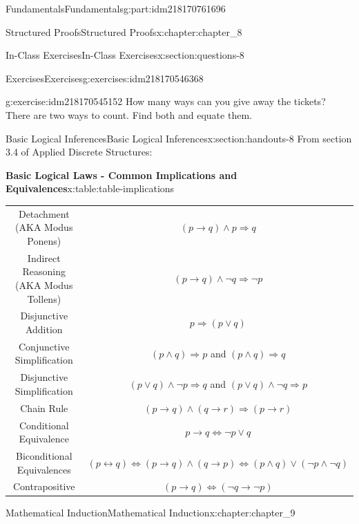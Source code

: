 \documentclass[oneside,10pt,]{book}
\newcommand{\tabularfont}{\relax}
\numberwithin{equation}{section}
\newcommand{\hrulemedium}{\noalign{\hrule height 0.07em}}
\begin{document}
\begin{partptx}{Fundamentals}{}{Fundamentals}{}{}{g:part:idm218170761696}
\begin{chapterptx}{Structured Proofs}{}{Structured Proofs}{}{}{x:chapter:chapter_8}
\begin{sectionptx}{In-Class Exercises}{}{In-Class Exercises}{}{}{x:section:questions-8}
\begin{exercises-subsection-numberless}{Exercises}{}{Exercises}{}{}{g:exercises:idm218170546368}
\begin{exercisegroup}
\begin{divisionexerciseeg}{3}{}{}{g:exercise:idm218170545152}
How many ways can you give away the tickets? There are two ways to count. Find both and equate them.%
\end{divisionexerciseeg}%
\end{exercisegroup}
\par\medskip\noindent
\end{exercises-subsection-numberless}
\end{sectionptx}
%
%
\typeout{************************************************}
\typeout{************************************************}
%
\begin{sectionptx}{Basic Logical Inferences}{}{Basic Logical Inferences}{}{}{x:section:handouts-8}
From section 3.4 of Applied Discrete Structures:%
\begin{tableptx}{\textbf{Basic Logical Laws - Common Implications and Equivalences}}{x:table:table-implications}{}%
%
%
%
%
\centering%
{\tabularfont%
\begin{tabular}{cc}
Detachment (AKA Modus Ponens)&\((p \rightarrow  q) \land  p\Rightarrow  q\)\tabularnewline\hrulemedium
Indirect Reasoning (AKA Modus Tollens)&\((p \to  q) \land  \neg q \Rightarrow  \neg p\)\tabularnewline\hrulemedium
Disjunctive Addition&\(p\Rightarrow (p\lor q)\)\tabularnewline\hrulemedium
Conjunctive Simplification&\((p \land  q) \Rightarrow  p\) and \((p \land  q) \Rightarrow  q\)\tabularnewline\hrulemedium
Disjunctive Simplification&\((p \lor  q) \land  \neg p \Rightarrow  q\) and \((p \lor q) \land \neg q\Rightarrow p\)\tabularnewline\hrulemedium
Chain Rule&\((p \to  q) \land  ( q \rightarrow  r) \Rightarrow  (p\to  r)\)\tabularnewline\hrulemedium
Conditional Equivalence&\(p \rightarrow  q \Leftrightarrow  \neg p \lor  q\)\tabularnewline\hrulemedium
Biconditional Equivalences&\((p \leftrightarrow  q) \Leftrightarrow  (p\rightarrow q) \land  (q \rightarrow  p)\Leftrightarrow (p \land  q) \lor  (\neg p \land  \neg q)\)\tabularnewline\hrulemedium
Contrapositive&\((p\to q) \Leftrightarrow (\neg q \to \neg p)\)
\end{tabular}
}%
\end{tableptx}%
\end{sectionptx}
\end{chapterptx}
%
\typeout{************************************************}
\typeout{************************************************}
%
\begin{chapterptx}{Mathematical Induction}{}{Mathematical Induction}{}{}{x:chapter:chapter_9}

\end{chapterptx}
\end{partptx}
\end{document}
